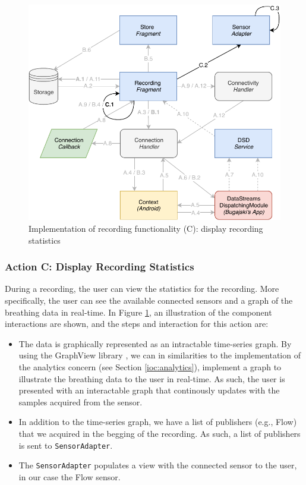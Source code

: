 \begin{figure}[!h]
    \centering
    \includegraphics[scale=0.7]{images/Recording_ImpC.pdf}
    \caption{Implementation of recording functionality (C): display recording statistics}
    \label{fig:impl_recordingC}
\end{figure}


\subsubsection{Action C: Display Recording Statistics}
During a recording, the user can view the statistics for the recording. More specifically, the user can see the available connected sensors and a graph of the breathing data in real-time. In Figure \ref{fig:impl_recordingC}, an illustration of the component interactions are shown, and the steps and interaction for this action are: 


\begin{itemize}
    \item[C.1] The data is graphically represented as an intractable time-series graph. By using the GraphView library \cite{androidgraph}, we can in similarities to the implementation of the analytics concern (see Section \ref{ioc:analytics}), implement a graph to illustrate the breathing data to the user in real-time. As such, the user is presented with an interactable graph that continously updates with the samples acquired from the sensor.
    \item[C.2] In addition to the time-series graph, we have a list of publishers (e.g., Flow) that we acquired in the begging of the recording. As such, a list of publishers is sent to \verb|SensorAdapter|. 
    \item[C.3] The \verb|SensorAdapter| populates a view with the connected sensor to the user, in our case the Flow sensor. 
\end{itemize}



